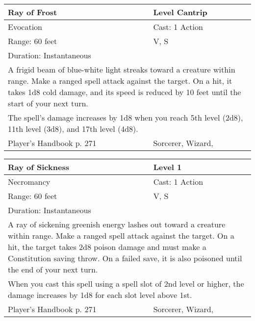 \documentclass[11pt]{report}
\begin{document}
\begin{table}[H]
	\begin{tabular}{||p{6cm}|p{6cm}||}
		\hline\hline
		\bf{Ray of Frost} & Level Cantrip\\ \hline
		Evocation & Cast: 1 Action\\ \hline
		Range: 60 feet & V, S\\ \hline
		Duration: Instantaneous & \\ \hline
		\multicolumn{2}{||p{12cm}||}{A frigid beam of blue-white light streaks toward a creature within range. Make a ranged spell attack against the target. On a hit, it takes 1d8 cold damage, and its speed is reduced by 10 feet until the start of your next turn.}\\ \hline
		\multicolumn{2}{||p{12cm}||}{The spell’s damage increases by 1d8 when you reach 5th level (2d8), 11th level (3d8), and 17th level (4d8).}\\ \hline
Player's Handbook p. 271 & Sorcerer, Wizard, \\ \hline\hline
	\end{tabular}
\end{table}

\begin{table}[H]
	\begin{tabular}{||p{6cm}|p{6cm}||}
		\hline\hline
		\bf{Ray of Sickness} & Level 1\\ \hline
		Necromancy & Cast: 1 Action\\ \hline
		Range: 60 feet & V, S\\ \hline
		Duration: Instantaneous & \\ \hline
		\multicolumn{2}{||p{12cm}||}{A ray of sickening greenish energy lashes out toward a creature within range.
Make a ranged spell attack against the target. On a hit, the target takes 2d8 poison damage and must make a Constitution saving throw. On a failed save, it is also poisoned until the end of your next turn.}\\ \hline
		\multicolumn{2}{||p{12cm}||}{When you cast this spell using a spell slot of 2nd level or higher, the damage increases by 1d8 for each slot level above 1st.}\\ \hline
Player's Handbook p. 271 & Sorcerer, Wizard, \\ \hline\hline
	\end{tabular}
\end{table}
\end{document}
